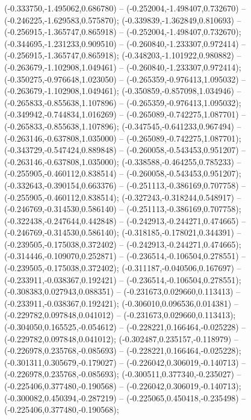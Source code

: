  (-0.333750,-1.495062,0.686780) -- (-0.252004,-1.498407,0.732670) -- (-0.246225,-1.629583,0.575870);
 (-0.339839,-1.362849,0.810693) -- (-0.256915,-1.365747,0.865918) -- (-0.252004,-1.498407,0.732670);
 (-0.344695,-1.231233,0.909510) -- (-0.260840,-1.233307,0.972414) -- (-0.256915,-1.365747,0.865918);
 (-0.348203,-1.101922,0.980882) -- (-0.263679,-1.102908,1.049461) -- (-0.260840,-1.233307,0.972414);
 (-0.350275,-0.976648,1.023050) -- (-0.265359,-0.976413,1.095032) -- (-0.263679,-1.102908,1.049461);
 (-0.350859,-0.857098,1.034946) -- (-0.265833,-0.855638,1.107896) -- (-0.265359,-0.976413,1.095032);
 (-0.349942,-0.744834,1.016269) -- (-0.265089,-0.742275,1.087701) -- (-0.265833,-0.855638,1.107896);
 (-0.347545,-0.641233,0.967494) -- (-0.263146,-0.637808,1.035000) -- (-0.265089,-0.742275,1.087701);
 (-0.343729,-0.547424,0.889848) -- (-0.260058,-0.543453,0.951207) -- (-0.263146,-0.637808,1.035000);
 (-0.338588,-0.464255,0.785233) -- (-0.255905,-0.460112,0.838514) -- (-0.260058,-0.543453,0.951207);
 (-0.332643,-0.390154,0.663376) -- (-0.251113,-0.386169,0.707758) -- (-0.255905,-0.460112,0.838514);
 (-0.327243,-0.318244,0.548917) -- (-0.246769,-0.314530,0.586140) -- (-0.251113,-0.386169,0.707758);
 (-0.322438,-0.247644,0.442848) -- (-0.242913,-0.244271,0.474665) -- (-0.246769,-0.314530,0.586140);
 (-0.318185,-0.178021,0.344391) -- (-0.239505,-0.175038,0.372402) -- (-0.242913,-0.244271,0.474665);
 (-0.314446,-0.109070,0.252871) -- (-0.236514,-0.106504,0.278551) -- (-0.239505,-0.175038,0.372402);
 (-0.311187,-0.040506,0.167697) -- (-0.233911,-0.038367,0.192421) -- (-0.236514,-0.106504,0.278551);
 (-0.308383,0.027943,0.088351) -- (-0.231673,0.029660,0.113413) -- (-0.233911,-0.038367,0.192421);
 (-0.306010,0.096536,0.014381) -- (-0.229782,0.097848,0.041012) -- (-0.231673,0.029660,0.113413);
 (-0.304050,0.165525,-0.054612) -- (-0.228221,0.166464,-0.025228) -- (-0.229782,0.097848,0.041012);
 (-0.302487,0.235157,-0.118979) -- (-0.226978,0.235768,-0.085693) -- (-0.228221,0.166464,-0.025228);
 (-0.301311,0.305679,-0.179027) -- (-0.226042,0.306019,-0.140713) -- (-0.226978,0.235768,-0.085693);
 (-0.300511,0.377340,-0.235027) -- (-0.225406,0.377480,-0.190568) -- (-0.226042,0.306019,-0.140713);
 (-0.300082,0.450394,-0.287219) -- (-0.225065,0.450418,-0.235498) -- (-0.225406,0.377480,-0.190568);
